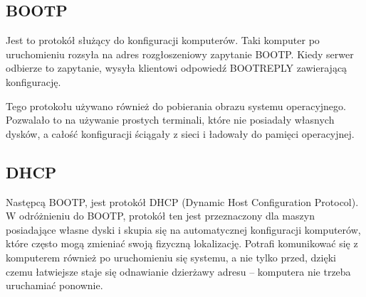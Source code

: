 \subsection{BOOTP}
Jest to protokół służący do konfiguracji komputerów.
Taki komputer po uruchomieniu rozsyła na adres rozgłoszeniowy zapytanie BOOTP.
Kiedy serwer odbierze to zapytanie, wysyła klientowi odpowiedź BOOTREPLY zawierającą konfigurację.

Tego protokołu używano również do pobierania obrazu systemu operacyjnego.
Pozwalało to na używanie prostych terminali, które nie posiadały własnych dysków, a całość konfiguracji ściągały z sieci i ładowały do pamięci operacyjnej.

\subsection{DHCP}
Następcą BOOTP, jest protokół DHCP (Dynamic Host Configuration Protocol).
W odróżnieniu do BOOTP, protokół ten jest przeznaczony dla maszyn posiadające własne dyski i skupia się na automatycznej konfiguracji komputerów, które często mogą zmieniać swoją fizyczną lokalizację.
Potrafi komunikować się z komputerem również po uruchomieniu się systemu, a nie tylko przed, dzięki czemu łatwiejsze staje się odnawianie dzierżawy adresu -- komputera nie trzeba uruchamiać ponownie.